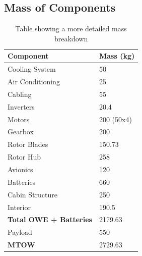 \documentclass[11pt,a4paper]{article}
\begin{document}
\begin{appendices}
\renewcommand\thefigure{A.\arabic{figure}}  
\setcounter{figure}{0}
\renewcommand\theequation{A.\arabic{equation}}  
\setcounter{equation}{0}
\renewcommand\thetable{A.\arabic{table}}  
\setcounter{table}{0}
\thispagestyle{empty}
%
%
\section{Mass of Components}
\begin{table}[H]
\centering
\caption{Table showing a more detailed mass breakdown}
\begin{tabular}{ll}
\hline
\rowcolor[HTML]{DAE8FC} 
Component                      & Mass (kg)                       \\ \hline
Cooling System                 & 50                              \\ \hline
Air Conditioning               & 25                              \\ \hline
Cabling                        & 55                              \\ \hline
Inverters                      & 20.4                            \\ \hline
Motors                         & 200 (50x4)                      \\ \hline
Gearbox                        & 200                             \\ \hline
Rotor Blades                   & 150.73                          \\ \hline
Rotor Hub                      & 258                             \\ \hline
Avionics                       & 120                             \\ \hline
Batteries                      & 660                             \\ \hline
Cabin Structure                & 250                             \\ \hline
Interior                       & 190.5                           \\ \hline
\textbf{Total OWE + Batteries} & \cellcolor[HTML]{FFCCC9}2179.63 \\ \hline
Payload                        & 550                             \\ \hline
\textbf{MTOW}                  & \cellcolor[HTML]{FFCCC9}2729.63 \\ \hline
\end{tabular}
\label{tab:massb}
\end{table}
%
%

\end{appendices}
\end{document}
